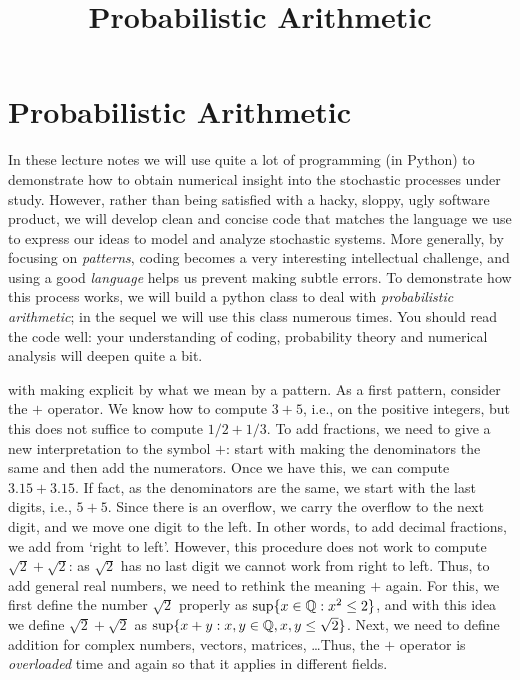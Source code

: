 \documentclass[stochastic-or]{subfiles}
\date{}
\title{Probabilistic Arithmetic}
\begin{document}
\maketitle
\section{Probabilistic Arithmetic}
\label{sec:org1d1dce6}
\label{sec:prob_artithmetic}

In these lecture notes we will use quite a lot of programming (in Python) to demonstrate how to obtain numerical insight into the stochastic processes under study.
However, rather than being satisfied with a hacky, sloppy, ugly software product, we will develop clean and concise code that matches the language we use to express our ideas to model and analyze stochastic systems.
More generally, by focusing on \emph{patterns}, coding becomes a very interesting intellectual challenge, and using a good \emph{language} helps us prevent making subtle errors.
To demonstrate how this process works, we will build a python class to deal with \emph{probabilistic arithmetic}; in the sequel we will use this class numerous times.
You should read the code well: your understanding of coding, probability theory and numerical analysis will deepen quite a bit.

 with making explicit by what we mean by a pattern.
As a first pattern, consider the \(+\) operator.
We know how to compute \(3+5\), i.e., on the positive integers, but this does not suffice to compute \(1/2 + 1/3\).
To add fractions, we need to give a new interpretation to the symbol \(+\): start with making the denominators the same and then add the numerators.
Once we have this, we can compute \(3.15 + 3.15\).
If fact, as the denominators are the same, we start with the last digits, i.e., \(5+5\).
Since there is an overflow, we carry the overflow to the next digit, and we move one digit to the left.
In other words, to add decimal fractions, we add from `right to left'.
However, this procedure does not work to compute \(\sqrt 2 + \sqrt 2\): as \(\sqrt 2\) has no last digit we cannot work from right to left.
Thus, to add general real numbers, we need to rethink the meaning \(+\) again.
For this, we first define the number \(\sqrt 2\) properly as \(\sup\{x \in \mathbb{Q} : x^{2} \leq 2\}\), and with this idea we define \(\sqrt 2 + \sqrt 2\) as \(\sup\{x + y : x, y \in \mathbb{Q}, x, y \leq \sqrt 2\}\).
Next, we need to define addition for complex numbers, vectors, matrices, \ldots Thus, the \(+\) operator is \emph{overloaded} time and again so that it applies in different fields.
\end{document}

